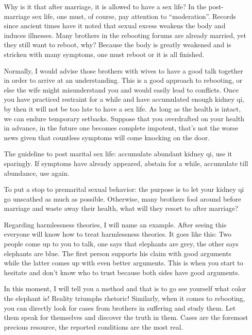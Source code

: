 \documentclass[
]{book}
\begin{document}
Why is it that after marriage, it is allowed to have a sex life? In the post-marriage sex life, one must, of course, pay attention to ``moderation''. Records since ancient times have it noted that sexual excess weakens the body and induces illnesses. Many brothers in the rebooting forums are already married, yet they still want to reboot, why? Because the body is greatly weakened and is stricken with many symptoms, one must reboot or it is all finished.

Normally, I would advise those brothers with wives to have a good talk together in order to arrive at an understanding. This is a good approach to rebooting, or else the wife might misunderstand you and would easily lead to conflicts. Once you have practiced restraint for a while and have accumulated enough kidney qi, by then it will not be too late to have a sex life. As long as the health is intact, we can endure temporary setbacks. Suppose that you overdrafted on your health in advance, in the future one becomes complete impotent, that's not the worse news given that countless symptoms will come knocking on the door.

The guideline to post marital sex life: accumulate abundant kidney qi, use it sparingly. If symptoms have already appeared, abstain for a while, accumulate till abundance, use again.

To put a stop to premarital sexual behavior: the purpose is to let your kidney qi go unscathed as much as possible. Otherwise, many brothers fool around before marriage and waste away their health, what will they resort to after marriage?

Regarding harmlessness theories, I will name an example. After seeing this everyone will know how to treat harmlessness theories. It goes like this: Two people come up to you to talk, one says that elephants are grey, the other says elephants are blue. The first person supports his claim with good arguments while the latter comes up with even better arguments. This is when you start to hesitate and don't know who to trust because both sides have good arguments.

In this moment, I will tell you a method and that is to go see yourself what color the elephant is! Reality triumphs rhetoric! Similarly, when it comes to rebooting, you can directly look for cases from brothers in suffering and study them. Let them speak for themselves and discover the truth in them. Cases are the foremost precious resource, the reported conditions are the most real.
\end{document}
